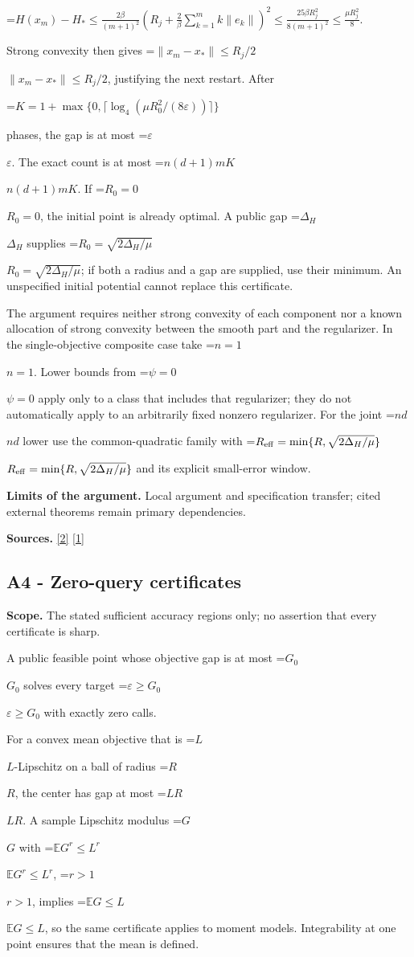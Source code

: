 \documentclass[10pt,a4paper]{article}
\newcommand{\AtlasMath}[1]{\par\begingroup\centering\setbox0=\hbox{$\displaystyle #1$}\ifdim\wd0>1.4\linewidth\typeout{ATLAS WIDE FORMULA: \the\wd0}\fi\ifdim\wd0>\linewidth\resizebox{\linewidth}{!}{\box0}\else\box0\fi\par\endgroup}
\newcommand{\AtlasInlineMath}[1]{\begingroup\setbox0=\hbox{$#1$}\ifdim\wd0>.4\linewidth\endgroup\AtlasMath{#1}\else\endgroup$#1$\fi}
\begin{document}
\AtlasMath{H(x_m)-H_*\le\frac{2\beta}{(m+1)^2}\left(R_j+\frac2\beta\sum_{k=1}^m k\|e_k\|\right)^2\le\frac{25\beta R_j^2}{8(m+1)^2}\le\frac{\mu R_j^2}{8}.}

Strong convexity then gives \AtlasInlineMath{\|x_m-x_*\|\le R_j/2}, justifying the next restart. After

\AtlasMath{K=1+\max\{0,\lceil\log_4(\mu R_0^2/(8\varepsilon))\rceil\}}

phases, the gap is at most \AtlasInlineMath{\varepsilon}. The exact count is at most \AtlasInlineMath{n(d+1)mK}. If \AtlasInlineMath{R_0=0}, the initial point is already optimal. A public gap \AtlasInlineMath{\Delta_H} supplies \AtlasInlineMath{R_0=\sqrt{2\Delta_H/\mu}}; if both a radius and a gap are supplied, use their minimum. An unspecified initial potential cannot replace this certificate.

The argument requires neither strong convexity of each component nor a known allocation of strong convexity between the smooth part and the regularizer. In the single-objective composite case take \AtlasInlineMath{n=1}. Lower bounds from \AtlasInlineMath{\psi=0} apply only to a class that includes that regularizer; they do not automatically apply to an arbitrarily fixed nonzero regularizer. For the joint \AtlasInlineMath{nd} lower use the common-quadratic family with \AtlasInlineMath{R_{\rm eff}=\min\{R,\sqrt{2\Delta_H/\mu}\}} and its explicit small-error window.

\textbf{Limits of the argument.} Local argument and specification transfer; cited external theorems remain primary dependencies.

\textbf{Sources.} \href{https://papers.neurips.cc/paper_files/paper/2011/file/8f7d807e1f53eff5f9efbe5cb81090fb-Paper.pdf}{[2]} \href{https://arxiv.org/html/2610.00345v1}{[1]}

\subsection{A4 - Zero-query certificates}
\textbf{Scope.} The stated sufficient accuracy regions only; no assertion that every certificate is sharp.

A public feasible point whose objective gap is at most \AtlasInlineMath{G_0} solves every target \AtlasInlineMath{\varepsilon\ge G_0} with exactly zero calls.

For a convex mean objective that is \AtlasInlineMath{L}-Lipschitz on a ball of radius \AtlasInlineMath{R}, the center has gap at most \AtlasInlineMath{LR}. A sample Lipschitz modulus \AtlasInlineMath{G} with \AtlasInlineMath{\mathbb E G^r\le L^r}, \AtlasInlineMath{r>1}, implies \AtlasInlineMath{\mathbb E G\le L}, so the same certificate applies to moment models. Integrability at one point ensures that the mean is defined.
\end{document}

